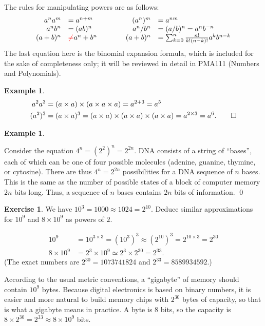 \documentclass[a4paper]{book}
\newcommand{\RED}[1]{{\color{red}#1}}
\newcommand{\tm}        {\times}
\renewcommand{\:}{\colon}
\newcommand{\PMA}[1]{PMA#1}
\newcommand{\bilabel}[1]{\hypertarget{#1}{\label{#1}}}
\theoremstyle{definition}
\newtheorem{example}[theorem]{Example}
\newtheorem{exercise}[theorem]{Exercise}
\renewenvironment{solution}{\SolutionInline}{\endSolutionInline}
\begin{document}
The rules for manipulating powers are as follows:
\[\begin{array}{rlcrl}
 {a^na^m}  & {=a^{n+m}} 
  & \hspace{2em} & 
 {(a^n)^m} & {=a^{nm}} \\ 
 {a^nb^n}  & {=(ab)^n} &&
 {a^n/b^n} & {=(a/b)^n=a^nb^{-n}} \\
 {(a+b)^n} & {\RED{\neq} a^n+b^n} &&
 {(a+b)^n} &
  {=\sum_{k=0}^n \frac{n!}{k!(n-k)!} a^k b^{n-k}} \\
\end{array}\]
The last equation here is the binomial expansion formula, which is
included for the sake of completeness only; it will be reviewed in
detail in \PMA{111} (Numbers and Polynomials).

\begin{example}
 \begin{align*}
  a^2a^3  &= (a\tm a)\tm(a\tm a\tm a) = a^{2+3} = a^5 \\
  (a^2)^3 &= (a\tm a)^3 = (a\tm a)\tm(a\tm a)\tm(a\tm a)
           = a^{2\tm 3} = a^6. \qed
 \end{align*}
\end{example}
\begin{example}\bilabel{eg-dna-info}
 Consider the equation $4^n=(2^2)^n=2^{2n}$.  DNA consists of a string
 of ``bases'', each of which can be one of four possible molecules
 (adenine, guanine, thymine, or cytosine).  There are thus
 $4^n=2^{2n}$ possibilities for a DNA sequence of $n$ bases.  This is
 the same as the number of possible states of a block of computer
 memory $2n$ bits long.  Thus, a sequence of $n$ bases contains $2n$
 bits of information. \qed
\end{example}
\begin{exercise}
 We have $10^3=1000\approx 1024=2^{10}$.  Deduce similar
 approximations for $10^9$ and $8\tm 10^9$ as powers of $2$.
\end{exercise}
\begin{solution}
 \begin{align*}
  10^9 &=10^{3\tm 3}=(10^3)^3\approx(2^{10})^3=2^{10\tm 3}=2^{30}\\
  8\tm 10^9 &= 2^3\tm 10^9\simeq 2^3\tm 2^{30} = 2^{33}.
 \end{align*}
 (The exact numbers are $2^{30}=1073741824$ and $2^{33}=8589934592$.)

 According to the usual metric conventions, a ``gigabyte'' of memory
 should contain $10^9$ bytes.  Because digital electronics is based on
 binary numbers, it is easier and more natural to build memory chips
 with $2^{30}$ bytes of capacity, so that is what a gigabyte means in
 practice.  A byte is $8$ bits, so the capacity is
 $8\tm 2^{30}=2^{33}\approx 8\tm 10^9$ bits.
\end{solution}
\end{document}
